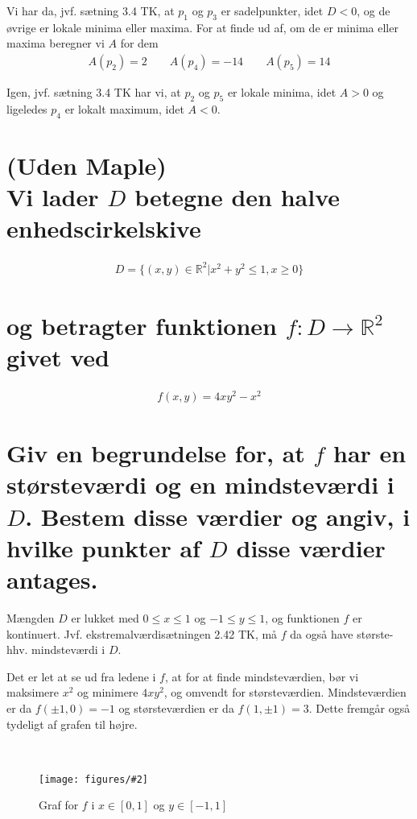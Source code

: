 \documentclass[11pt,a4paper]{article}
\newcommand{\colbreak}{\vfill{\ }\columnbreak}
\newcommand{\fig}[4]
{
    \begin{figure}[H]
        \centering
        \texttt{[image: figures/\#2]}
        \caption{#4}
        \label{fig:#1}
    \end{figure}
}
\begin{document}
Vi har da, jvf. sætning 3.4 TK, at $p_1$ og $p_3$ er sadelpunkter, idet
$D < 0$, og de øvrige er lokale minima eller maxima. For at finde ud af, om
de er minima eller maxima beregner vi $A$ for dem
\begin{align}
    A(p_2) = 2 \qquad
    A(p_4) = -14 \qquad
    A(p_5) = 14
\end{align}

Igen, jvf. sætning 3.4 TK har vi, at $p_2$ og $p_5$ er lokale minima, idet
$A > 0$ og ligeledes $p_4$ er lokalt maximum, idet $A < 0$.

\section
{
    \mdseries (Uden Maple)\\
    Vi lader $D$ betegne den halve enhedscirkelskive
}
\begin{align}
    D = \{ (x,y) \in \mathbb{R}^2 | x^2 + y^2 \leq 1, x \geq 0 \}
\end{align}
\section*
{
    \mdseries
    og betragter funktionen $f : D \rightarrow \mathbb{R}^2$ givet ved
}
\begin{align}
    f(x,y) = 4xy^2 - x^2
\end{align}
\section*
{
    \mdseries
    Giv en begrundelse for, at $f$ har en størsteværdi og en mindsteværdi i
    $D$. Bestem disse værdier og angiv, i hvilke punkter af $D$ disse
    værdier antages.
}
\begin{multicols}{2}
    Mængden $D$ er lukket med $0 \leq x \leq 1$ og $-1 \leq y \leq 1$, og
    funktionen $f$ er kontinuert. Jvf. ekstremalværdisætningen 2.42 TK, må
    $f$ da også have største- hhv. mindsteværdi i $D$.

    Det er let at se ud fra ledene i $f$, at for at finde mindsteværdien,
    bør vi maksimere $x^2$ og minimere $4xy^2$, og omvendt for
    størsteværdien. Mindsteværdien er da $f(\pm 1,0) = -1$ og størsteværdien
    er da $f(1,\pm 1) = 3$. Dette fremgår også tydeligt af grafen til højre.
    

    \colbreak

    \fig{8.2}{8-2-f.png}{0.5}{Graf for $f$ i $x \in [0,1]$ og $y \in [-1,1]$}

\end{multicols}
\end{document}
